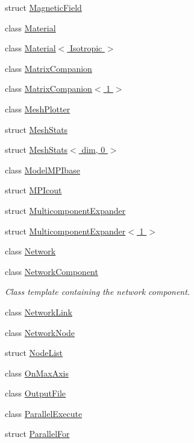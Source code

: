 \begin{DoxyCompactItemize}
struct \hyperlink{structmodel_1_1_magnetic_field}{Magnetic\+Field}
\item 
class \hyperlink{classmodel_1_1_material}{Material}
\item 
class \hyperlink{classmodel_1_1_material_3_01_isotropic_01_4}{Material$<$ Isotropic $>$}
\item 
class \hyperlink{classmodel_1_1_matrix_companion}{Matrix\+Companion}
\item 
class \hyperlink{classmodel_1_1_matrix_companion_3_011_01_4}{Matrix\+Companion$<$ 1 $>$}
\item 
class \hyperlink{classmodel_1_1_mesh_plotter}{Mesh\+Plotter}
\item 
struct \hyperlink{structmodel_1_1_mesh_stats}{Mesh\+Stats}
\item 
struct \hyperlink{structmodel_1_1_mesh_stats_3_01dim_00_010_01_4}{Mesh\+Stats$<$ dim, 0 $>$}
\item 
class \hyperlink{classmodel_1_1_model_m_p_ibase}{Model\+M\+P\+Ibase}
\item 
struct \hyperlink{structmodel_1_1_m_p_icout}{M\+P\+Icout}
\item 
struct \hyperlink{structmodel_1_1_multicomponent_expander}{Multicomponent\+Expander}
\item 
struct \hyperlink{structmodel_1_1_multicomponent_expander_3_011_01_4}{Multicomponent\+Expander$<$ 1 $>$}
\item 
class \hyperlink{classmodel_1_1_network}{Network}
\item 
class \hyperlink{classmodel_1_1_network_component}{Network\+Component}
\begin{DoxyCompactList}\small\item\em Class template containing the network component. \end{DoxyCompactList}\item 
class \hyperlink{classmodel_1_1_network_link}{Network\+Link}
\item 
class \hyperlink{classmodel_1_1_network_node}{Network\+Node}
\item 
struct \hyperlink{structmodel_1_1_node_list}{Node\+List}
\item 
class \hyperlink{classmodel_1_1_on_max_axis}{On\+Max\+Axis}
\item 
class \hyperlink{classmodel_1_1_output_file}{Output\+File}
\item 
class \hyperlink{classmodel_1_1_parallel_execute}{Parallel\+Execute}
\item 
struct \hyperlink{structmodel_1_1_parallel_for}{Parallel\+For}

\end{DoxyCompactItemize}
